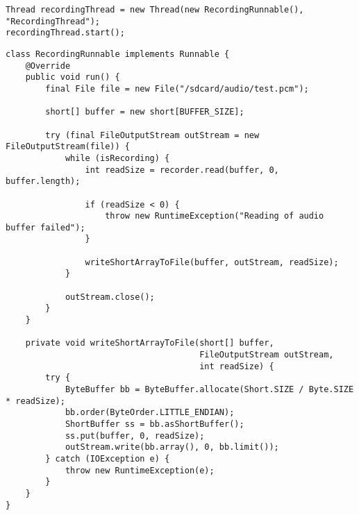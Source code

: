 \begin{verbatim}
Thread recordingThread = new Thread(new RecordingRunnable(), "RecordingThread");
recordingThread.start();
\end{verbatim}

\begin{verbatim}
class RecordingRunnable implements Runnable {
    @Override
    public void run() {
        final File file = new File("/sdcard/audio/test.pcm");

        short[] buffer = new short[BUFFER_SIZE];

        try (final FileOutputStream outStream = new FileOutputStream(file)) {
            while (isRecording) {
                int readSize = recorder.read(buffer, 0, buffer.length);

                if (readSize < 0) {
                    throw new RuntimeException("Reading of audio buffer failed");
                }

                writeShortArrayToFile(buffer, outStream, readSize);
            }

            outStream.close();
        }
    }
    
    private void writeShortArrayToFile(short[] buffer,
                                       FileOutputStream outStream,
                                       int readSize) {
        try {
            ByteBuffer bb = ByteBuffer.allocate(Short.SIZE / Byte.SIZE * readSize);
            bb.order(ByteOrder.LITTLE_ENDIAN);
            ShortBuffer ss = bb.asShortBuffer();
            ss.put(buffer, 0, readSize);
            outStream.write(bb.array(), 0, bb.limit());
        } catch (IOException e) {
            throw new RuntimeException(e);
        }
    }
}
\end{verbatim}

